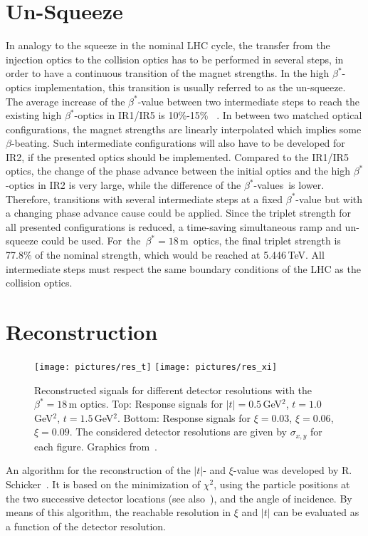 \newpage

\section{Un-Squeeze}
In analogy to the squeeze in the nominal LHC cycle, the transfer from the injection optics to the collision optics has to be performed in several steps, in order to have a continuous transition of the magnet strengths. In the high $\beta^*$-optics implementation, this transition is usually referred to as the un-squeeze. The average increase of the $\beta^*$-value between two intermediate steps to reach the existing high $\beta^*$-optics in IR1/IR5 is 10\%-15\%~\cite{helmut_private}%
. In between two matched optical configurations, the magnet strengths are linearly interpolated which implies some $\beta$-beating. 
\newpage
Such intermediate configurations will also have to be developed for IR2, if the presented optics should be implemented. Compared to the IR1/IR5 optics, the change of the phase advance between the initial optics and the high $\beta^*$-optics in IR2 is very large, while the difference of the \mbox{$\beta^*$-values is} lower. Therefore, transitions with several intermediate steps at a fixed \mbox{$\beta^*$-value} but with a changing phase advance cause could be applied. Since the triplet strength for all presented configurations is reduced, a time-saving simultaneous ramp and un-squeeze could be used. \mbox{For the $\beta^*=18\,$m optics}, the final triplet strength is 77.8\% of the nominal strength, which would be reached at 5.446$\,$TeV. All intermediate steps must respect the same boundary conditions of the LHC as the collision optics. 
%
\section{Reconstruction}
\begin{figure}[b]
\centering
\texttt{[image: pictures/res\_t]}
\texttt{[image: pictures/res\_xi]}
    \caption{Reconstructed signals for different detector resolutions with the $\beta^*=18\,$m optics. Top: Response signals for $|t|=0.5\,$GeV$^2$, $t=1.0\,$GeV$^2$, $t=1.5\,$GeV$^2$.  Bottom: Response signals for $\xi =0.03$, $\xi=0.06$, $\xi=0.09$. The considered detector resolutions are given by $\sigma_{x,y}$ for each figure. Graphics from~\cite{schicker_talk}.} 
    \label{fig:resolution}
\end{figure}
An algorithm for the reconstruction of the $|t|$- and $\xi$-value was developed by R. Schicker~\cite{schicker_talk}. It is based on the minimization of $\chi^2$, using the particle positions at the two successive detector locations (see also~\cite{trzebinski2011lhc}), and the angle of incidence. By means of this algorithm, the reachable resolution in $\xi$ and $|t|$ can be evaluated as a function of the detector resolution. 


